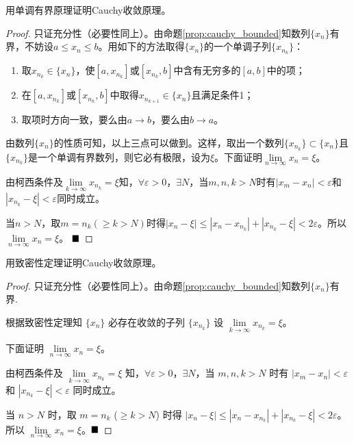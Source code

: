\begin{problem}
    用单调有界原理证明Cauchy收敛原理。
\end{problem}

\begin{proof}
只证充分性（必要性同上）。由命题\ref{prop:cauchy_bounded}知数列$\{x_n\}$有界，不妨设$a \leq x_n \leq b$。用如下的方法取得$\{x_n\}$的一个单调子列$\{x_{n_k}\}$：

\begin{enumerate}
    \item 取$x_{n_k} \in \{x_n\}$，使$[a, x_{n_k}]$或$[x_{n_k}, b]$中含有无穷多的$[a, b]$中的项；
    \item 在$[a, x_{n_k}]$或$[x_{n_k}, b]$中取得$x_{n_{k+1}} \in \{x_n\}$且满足条件1；
    \item 取项时方向一致，要么由$a \to b$，要么由$b \to a$。
\end{enumerate}

由数列$\{x_n\}$的性质可知，以上三点可以做到。这样，取出一个数列$\{x_{n_k}\} \subset \{x_n\}$且$\{x_{n_k}\}$是一个单调有界数列，则它必有极限，设为$\xi$。下面证明$\lim\limits_{n \to \infty} x_n = \xi$。

由柯西条件及$\lim\limits_{k \to \infty} x_{n_k} = \xi$知，$\forall \varepsilon > 0$，$\exists N$，当$m, n, k > N$时有$|x_m - x_n| < \varepsilon$和$|x_{n_k} - \xi| < \varepsilon$同时成立。

当$n > N$，取$m = n_k (\geq k > N)$时得$|x_n - \xi| \leq |x_n - x_{n_k}| + |x_{n_k} - \xi| < 2\varepsilon$。所以$\lim\limits_{n \to \infty} x_n = \xi$。 $\hfill \blacksquare$
\end{proof}

\begin{problem}
    用致密性定理证明Cauchy收敛原理。
\end{problem}

\begin{proof}
    只证充分性（必要性同上）。由命题\ref{prop:cauchy_bounded}知数列$\{x_n\}$有界.

        根据致密性定理知 $\{x_n\}$ 必存在收敛的子列 $\{x_{n_k}\}$ 设 $\lim\limits_{k \to \infty} x_{n_k} = \xi$。
        
        下面证明 $\lim\limits_{n \to \infty} x_n = \xi$。
        
        由柯西条件及 $\lim\limits_{k \to \infty} x_{n_k} = \xi$ 知，$\forall \varepsilon > 0$，$\exists N$，当 $m, n, k > N$ 时有 $|x_m - x_n| < \varepsilon$ 和 $|x_{n_k} - \xi| < \varepsilon$ 同时成立。
        
        当 $n > N$ 时，取 $m = n_k$ ($\geq k > N$) 时得 $|x_n - \xi| \leq |x_n - x_{n_k}| + |x_{n_k} - \xi| < 2\varepsilon$。
        所以 $\lim\limits_{n \to \infty} x_n = \xi$。$\hfill \blacksquare$

\end{proof}

